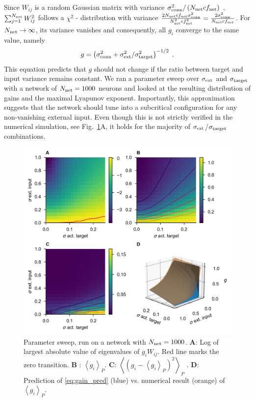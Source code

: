 \documentclass[10pt,a4paper]{article}
\newcommand{\avgp}[1]{\left< #1 \right>_P}
\begin{document}
Since $W_{ij}$ is a random Gaussian matrix with variance $\sigma_{\rm conn}^2/\left( N_{\rm net} cf_{\rm net} \right)$ , $\sum_{j=1}^{N_{\rm net}} W_{ij}^2$ follows a $\chi^2$ - distribution with variance $\frac{2N_{\rm net} cf_{\rm net} \sigma_{\rm conn}^2}{N_{\rm net}^2 cf_{\rm net}^2} = \frac{2 \sigma_{\rm conn}^2}{N_{\rm net} cf_{\rm net}}$. For $N_{\rm net} \rightarrow \infty $, its variance vanishes and consequently, all $g_i$ converge to the same value, namely 
\begin{equation}
	g = \left(\sigma_{\rm conn}^2 + \sigma_{\rm ext}^2 / \sigma_{\rm target}^2\right)^{-1/2} \; . \label{eq:gain_pred}
\end{equation}
This equation predicts that $g$ should not change if the ratio between target and input variance remains constant. We ran a parameter sweep over $\sigma_{\rm ext}$ and $\sigma_{\rm target}$ with a network of $N_{\rm net} = 1000$ neurons and looked at the resulting distribution of gains and the maximal Lyapunov exponent. Importantly, this approximation suggests that the network should tune into a subcritical configuration for any non-vanishing external input. Even though this is not strictly verified in the numerical simulation, see Fig.~\ref{fig:gain_std_in_std_targ_sweep}A, it holds for the majority of $ \sigma_{\rm ext}$/$\sigma_{\rm target}$ combinations.
\begin{figure}
	\includegraphics[width=\textwidth]{../plots/std_in_std_target_sweep_fig.png}
	\caption{Parameter sweep, run on a network with $N_{\rm net}=1000$. {\bf A}: Log of largest absolute value of eigenvalues of $g_i W_{ij}$. Red line marks the zero transition. {\bf B} : $\avgp{g_i}$. {\bf C}: $\avgp{(g_i - \avgp{g_i})^2}$ . {\bf D}: Prediction of \eqref{eq:gain_pred} (blue) vs. numerical result (orange) of $\avgp{g_i}$. }
	\label{fig:gain_std_in_std_targ_sweep}
\end{figure} 
\end{document}

